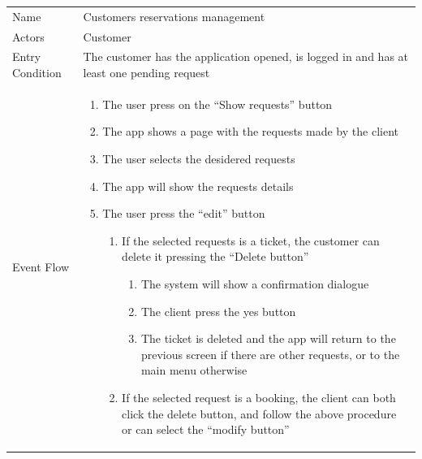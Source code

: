\documentclass{article}
\newcommand\xrowht[2][0]
{\addstackgap[.5\dimexpr#2\relax]{\vphantom{#1}}}
\begin{document}
				\begin{center}
					
					
					\begin{adjustwidth}{-1.5cm}{}
						\begin{tabular}[h!]{|m{7.5em}|m{27.5em}|}
							\hline
							\xrowht{5pt}
							Name & Customers reservations management\\
							\xrowht{5pt}
							Actors & Customer\\
							\xrowht{5pt}
							Entry Condition & The customer has the application opened, is logged in and has at least one pending request\\
							\xrowht{5pt}
							Event Flow & \begin{enumerate}
								
								\itemsep-0.25em
								\item The user press on the “Show requests” button
								\item The app shows a page with the requests made by the client
								\item The user selects the desidered requests
								\item The app will show the requests details
								\item The user press the “edit” button
								
								\begin{enumerate}
									
									\item If the selected requests is a ticket, the customer can delete it pressing the “Delete button”
									
									\begin{enumerate}
										
										\item The system will show a confirmation dialogue
										\item The client press the yes button
										\item The ticket is deleted and the app will return to the previous screen if there are other requests, or to the main menu otherwise
										
									\end{enumerate}
								
									\item If the selected request is a booking, the client can both click the delete button, and follow the above procedure or can select the “modify button”
									

\end{enumerate}
\end{enumerate}
\end{tabular}
\end{adjustwidth}
\end{center}
\end{document}
